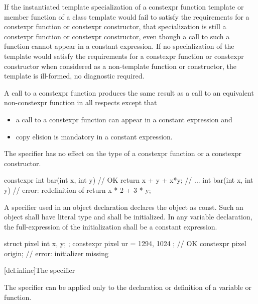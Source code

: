 \pnum
If the instantiated template specialization of a constexpr function
template
or member function of a class template
would fail to satisfy the requirements for a constexpr
function or constexpr constructor,
that specialization is still a constexpr function or constexpr
constructor, even though a call to such a function cannot appear in a constant
expression. If no specialization of the template would satisfy the
requirements for a constexpr function or constexpr constructor
when considered as a non-template function or constructor, the template is
ill-formed, no diagnostic required.

\pnum
A call to a constexpr function produces the same result as a call to an equivalent
non-constexpr function in all respects except that
\begin{itemize}
\item
a call to a constexpr
function can appear in a constant expression and
\item
copy elision is mandatory in a constant expression.
\end{itemize}

\pnum
The  specifier has no
effect on the type of a constexpr function or a constexpr constructor.  \begin{example}
\begin{codeblock}
constexpr int bar(int x, int y)         // OK
    { return x + y + x*y; }
// ...
int bar(int x, int y)                   // error: redefinition of 
    { return x * 2 + 3 * y; }
\end{codeblock}
\end{example}

\pnum
A  specifier used in an object declaration
declares the object as const.
Such an object
shall have literal type and
shall be initialized.
In any  variable declaration,
the full-expression of the initialization
shall be a constant expression.
\begin{example}
\begin{codeblock}
struct pixel {
  int x, y;
};
constexpr pixel ur = { 1294, 1024 };    // OK
constexpr pixel origin;                 // error: initializer missing
\end{codeblock}
\end{example}

[dcl.inline]{The  specifier}%

\pnum
The  specifier can be applied only to the declaration
or definition of a variable or function.

